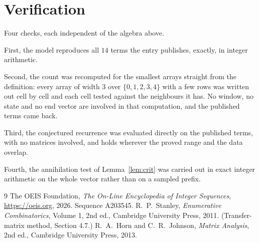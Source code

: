 \documentclass[11pt,a4paper]{article}
\theoremstyle{plain}
\theoremstyle{definition}
\begin{document}
\section{Verification}

Four checks, each independent of the algebra above.

First, the model reproduces all $14$ terms the entry publishes, exactly, in integer
arithmetic.

Second, the count was recomputed for the smallest arrays straight from the definition: every
array of width $3$ over $\{0,1,2,3,4\}$ with a few rows was written out cell by cell and each cell
tested against the neighbours it has. No window, no state and no end vector are involved in that
computation, and the published terms came back.

Third, the conjectured recurrence was evaluated directly on the published terms, with no
matrices involved, and holds wherever the proved range and the data overlap.

Fourth, the annihilation test of Lemma~\ref{lem:crit} was carried out in exact integer
arithmetic on the whole vector rather than on a sampled prefix.

\begin{thebibliography}{9}
 The OEIS Foundation, \emph{The On-Line Encyclopedia of Integer
Sequences}, \url{https://oeis.org}, 2026. Sequence A203545.
 R.~P.~Stanley, \emph{Enumerative Combinatorics}, Volume 1, 2nd ed.,
Cambridge University Press, 2011. (Transfer-matrix method, Section 4.7.)
 R.~A.~Horn and C.~R.~Johnson, \emph{Matrix Analysis}, 2nd ed., Cambridge
University Press, 2013.
\end{thebibliography}
\end{document}
